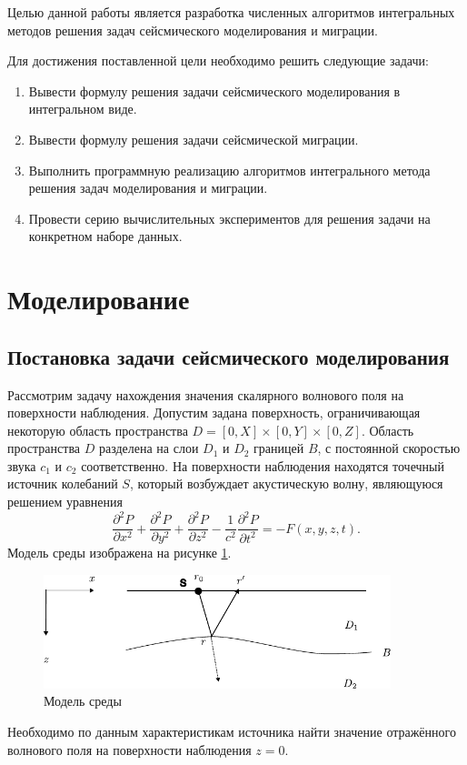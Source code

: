 \documentclass[a4paper, fontsize=14pt]{article}
\begin{document}
	
	Целью данной работы является разработка численных алгоритмов интегральных методов решения задач сейсмического моделирования и миграции. 
	
	Для достижения поставленной цели необходимо решить следующие задачи:
	\begin{enumerate}
		\item Вывести формулу решения задачи сейсмического моделирования в интегральном виде.
		\item Вывести формулу решения задачи сейсмической миграции.
		\item Выполнить программную реализацию алгоритмов интегрального метода решения задач моделирования и миграции.
		\item Провести серию вычислительных экспериментов для решения задачи на конкретном наборе данных.
	\end{enumerate}

	
	\newpage
	\section{Моделирование} 
	\subsection{Постановка задачи сейсмического моделирования} 

	Рассмотрим задачу нахождения значения скалярного волнового поля на поверхности
	наблюдения.
	Допустим задана поверхность, ограничивающая некоторую область пространства
	$D=[0,X]\times [0,Y]\times [0,Z]$.
	Область пространства $D$ разделена на слои $D_1$ и $D_2$ границей $B$, с постоянной
	скоростью звука $c_1$ и $c_2$ соответственно.
	На поверхности наблюдения находятся точечный источник колебаний $S$, который возбуждает
	акустическую волну, являющуюся решением уравнения
	\begin{equation}
		\frac{\partial^2 P}{\partial x^2} + \frac{\partial^2 P}{\partial y^2} +
		\frac{\partial^2 P}{\partial z^2} - \frac{1}{c^2} \frac{\partial^2 P}{\partial
			t^2} = -F(x,y,z,t).
		\label{eq:wav}	
	\end{equation} 
	Модель среды изображена на рисунке \ref{fig:mig}.
	
	\begin{figure}[h]
		
		\centering
		\includegraphics[width=0.9\textwidth]{migration_fig.pdf}
		
		\caption{Модель среды}
		\label{fig:mig}
	\end{figure}
	Необходимо по данным характеристикам источника найти значение отражённого волнового поля
	на поверхности наблюдения $z=0$.
	
\end{document}
